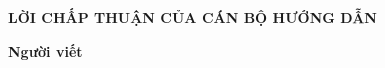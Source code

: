 \documentclass[../../../thesis]{subfiles}
\begin{document}
\begin{center}
    \textbf{\large
        LỜI CHẤP THUẬN CỦA CÁN BỘ HƯỚNG DẪN
    }
\end{center}

\vspace*{6cm}

\begin{changemargin}{12cm}{1cm}
    \textbf{Người viết}
\end{changemargin}

\thispagestyle{empty}

\clearpage
\end{document}
